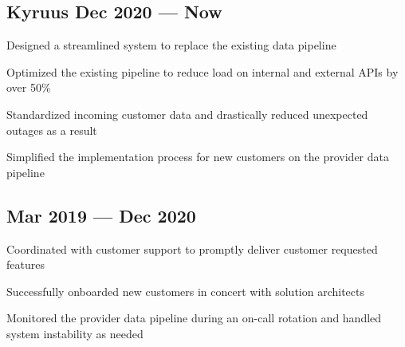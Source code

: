 

\subsection{{Kyruus \hfill Dec 2020 --- Now}}
\begin{zitemize}
\item Designed a streamlined system to replace the existing data pipeline
\item Optimized the existing pipeline to reduce load on internal and external APIs by over 50\%
\item Standardized incoming customer data and drastically reduced unexpected outages as a result
\item Simplified the implementation process for new customers on the provider data pipeline
\end{zitemize}

\subsection{{\hfill Mar 2019 --- Dec 2020}}
\begin{zitemize}
\item Coordinated with customer support to promptly deliver customer requested features
\item Successfully onboarded new customers in concert with solution architects
\item Monitored the provider data pipeline during an on-call rotation and handled system instability as needed
\end{zitemize}

